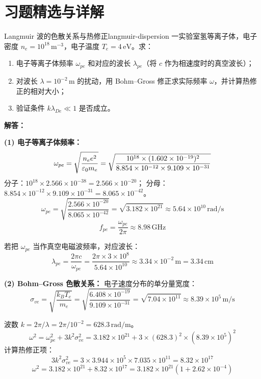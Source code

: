 
\section*{习题精选与详解}
{}

\begin{example}{Langmuir 波的色散关系与热修正}{langmuir-dispersion}
一实验室氢等离子体，电子密度 $n_e=10^{18}\,\mathrm{m}^{-3}$，电子温度 $T_e=4\,\mathrm{eV}$。求：
\begin{enumerate}[label=(\arabic*)]
\item 电子等离子体频率 $\omega_{pe}$ 和对应的波长 $\lambda_{pe}$（将 $c$ 作为相速度时的真空波长）；
\item 对波长 $\lambda=10^{-2}\,\mathrm{m}$ 的扰动，用 Bohm--Gross 修正求实际频率 $\omega$，并计算热修正的相对大小；
\item 验证条件 $k\lambda_{De}\ll 1$ 是否成立。
\end{enumerate}
\tcblower
\textbf{解答：}

\textbf{(1) 电子等离子体频率：}
\[
\omega_{pe} = \sqrt{\frac{n_e e^2}{\varepsilon_0 m_e}} = \sqrt{\frac{10^{18}\times (1.602\times 10^{-19})^2}{8.854\times 10^{-12}\times 9.109\times 10^{-31}}}
\]
分子：$10^{18}\times 2.566\times 10^{-38} = 2.566\times 10^{-20}$；
分母：$8.854\times 10^{-12}\times 9.109\times 10^{-31} = 8.065\times 10^{-42}$。
\[
\omega_{pe} = \sqrt{\frac{2.566\times 10^{-20}}{8.065\times 10^{-42}}} = \sqrt{3.182\times 10^{21}} \approx 5.64\times 10^{10}\,\mathrm{rad/s}
\]
\[
f_{pe} = \frac{\omega_{pe}}{2\pi} \approx 8.98\,\mathrm{GHz}
\]

若把 $\omega_{pe}$ 当作真空电磁波频率，对应波长：
\[
\lambda_{pe} = \frac{2\pi c}{\omega_{pe}} = \frac{2\pi\times 3\times 10^8}{5.64\times 10^{10}} \approx 3.34\times 10^{-2}\,\mathrm{m} = 3.34\,\mathrm{cm}
\]

\textbf{(2) Bohm--Gross 色散关系：}
电子速度分布的单分量宽度：
\[
\sigma_{ve} = \sqrt{\frac{k_{\!B}T_e}{m_e}} = \sqrt{\frac{6.408\times 10^{-19}}{9.109\times 10^{-31}}} = \sqrt{7.04\times 10^{11}} \approx 8.39\times 10^5\,\mathrm{m/s}
\]

波数 $k=2\pi/\lambda = 2\pi/10^{-2} = 628.3\,\mathrm{rad/m}$。
\[
\omega^2 = \omega_{pe}^2 + 3k^2\sigma_{ve}^2 = 3.182\times 10^{21} + 3\times(628.3)^2\times(8.39\times 10^5)^2
\]
计算热修正项：
\[
3k^2\sigma_{ve}^2 = 3\times 3.944\times 10^5\times 7.035\times 10^{11} = 8.32\times 10^{17}
\]
\[
\omega^2 = 3.182\times 10^{21} + 8.32\times 10^{17} = 3.182\times 10^{21}\left(1 + 2.62\times 10^{-4}\right)
\]


\end{example}
